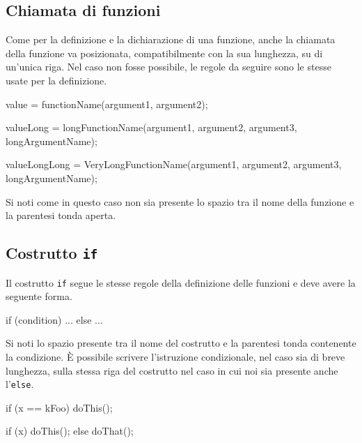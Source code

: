 \subsection{Chiamata di funzioni}

Come per la definizione e la dichiarazione di una funzione, anche la chiamata della funzione va posizionata, compatibilmente con la sua lunghezza, su di un'unica riga.
Nel caso non fosse possibile, le regole da seguire sono le stesse usate per la definizione.

\begin{minipage}[t]{\rbwidth}
\begin{RightCode}
value = functionName(argument1, argument2);

valueLong = longFunctionName(argument1, argument2, argument3,
                             longArgumentName);

valueLongLong = VeryLongFunctionName(argument1,
                                     argument2,
                                     argument3,
                                     longArgumentName);
\end{RightCode}
\end{minipage}%

Si noti come in questo caso non sia presente lo spazio tra il nome della funzione e la parentesi tonda aperta.

\subsection{Costrutto \texttt{if}}

Il costrutto \texttt{if} segue le stesse regole della definizione delle funzioni e deve avere la seguente forma.

\begin{minipage}[t]{\rbwidth}
\begin{RightCode}
if (condition)
{
  ...
}
else
{
  ...
}
\end{RightCode}
\end{minipage}%

Si noti lo spazio presente tra il nome del costrutto e la parentesi tonda contenente la condizione.
È possibile scrivere l'istruzione condizionale, nel caso sia di breve lunghezza, sulla stessa riga del costrutto nel caso in cui noi sia presente anche l'\texttt{else}.

\begin{minipage}[t]{\cbwidth}
\begin{RightCode}
if (x == kFoo) doThis();
\end{RightCode}
\end{minipage}%
\hspace{\cbdistance}
\begin{minipage}[t]{\cbwidth}
\begin{ErrorCode}
if (x) doThis();
else doThat();
\end{ErrorCode}
\end{minipage}


